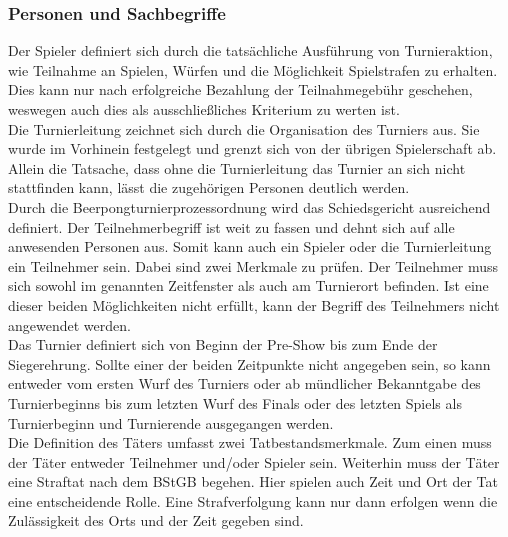 \documentclass[a4paper, 12pt]{article}
\begin{document}
\subsubsection{Personen und Sachbegriffe}
Der Spieler definiert sich durch die tatsächliche Ausführung von Turnieraktion, wie Teilnahme an Spielen, Würfen und die Möglichkeit Spielstrafen zu erhalten. Dies kann nur nach erfolgreiche Bezahlung der Teilnahmegebühr geschehen, weswegen auch dies als ausschließliches Kriterium zu werten ist.\\
Die Turnierleitung zeichnet sich durch die Organisation des Turniers aus. Sie wurde im Vorhinein festgelegt und grenzt sich von der übrigen Spielerschaft ab. Allein die Tatsache, dass ohne die Turnierleitung das Turnier an sich nicht stattfinden kann, lässt die zugehörigen Personen deutlich werden. \\
Durch die Beerpongturnierprozessordnung wird das Schiedsgericht ausreichend definiert.
Der Teilnehmerbegriff ist weit zu fassen und dehnt sich auf alle anwesenden Personen aus. Somit kann auch ein Spieler oder die Turnierleitung ein Teilnehmer sein. Dabei sind zwei Merkmale zu prüfen. Der Teilnehmer muss sich sowohl im genannten Zeitfenster als auch am Turnierort befinden. Ist eine dieser beiden Möglichkeiten nicht erfüllt, kann der Begriff des Teilnehmers nicht angewendet werden.\\
Das Turnier definiert sich von Beginn der Pre-Show bis zum Ende der Siegerehrung. Sollte einer der beiden Zeitpunkte nicht angegeben sein, so kann entweder vom ersten Wurf des Turniers oder ab mündlicher Bekanntgabe des Turnierbeginns bis zum letzten Wurf des Finals oder des letzten Spiels als Turnierbeginn und Turnierende ausgegangen werden.\\
Die Definition des Täters umfasst zwei Tatbestandsmerkmale. Zum einen muss der Täter entweder Teilnehmer und/oder Spieler sein. Weiterhin muss der Täter eine Straftat nach dem BStGB begehen. Hier spielen auch Zeit und Ort der Tat eine entscheidende Rolle. Eine Strafverfolgung kann nur dann erfolgen wenn die Zulässigkeit des Orts und der Zeit gegeben sind.\\
\end{document}
